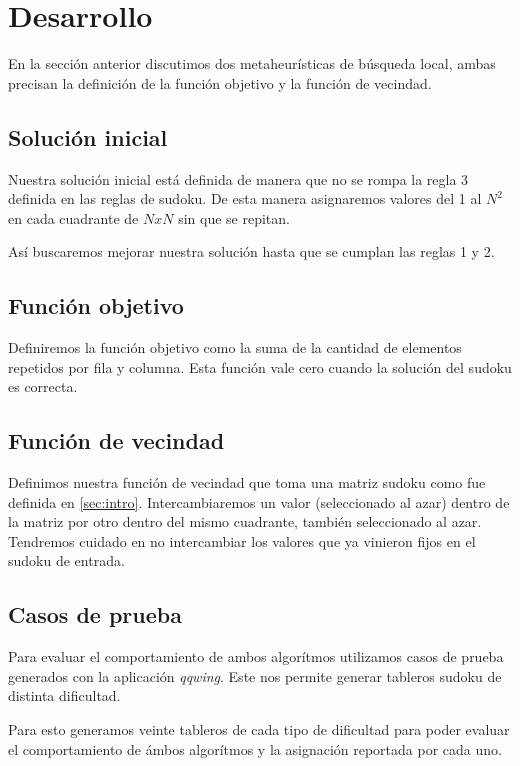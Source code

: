 \documentclass[a4paper,spanish]{article}
\begin{document}
\section{Desarrollo}


En la sección anterior discutimos dos metaheurísticas de búsqueda local, ambas
precisan la definición de la función objetivo y la función de vecindad.

\subsection{Solución inicial}

Nuestra solución inicial está definida de manera que no se rompa la regla 3
definida en las reglas de sudoku. De esta manera asignaremos valores del 1 al
$N^2$ en cada cuadrante de $NxN$ sin que se repitan.

Así buscaremos mejorar nuestra solución hasta que se cumplan las reglas 1 y 2. 

\subsection{Función objetivo}

Definiremos la función objetivo como la suma de la cantidad de elementos
repetidos por fila y columna.  
Esta función vale cero cuando la solución del sudoku es correcta.

\subsection{Función de vecindad}

Definimos nuestra función de vecindad que toma una matriz sudoku como fue
definida en \ref{sec:intro}.
Intercambiaremos un valor (seleccionado al azar) dentro de la matriz por otro
dentro del mismo cuadrante, también seleccionado al azar. Tendremos cuidado en
no intercambiar los valores que ya vinieron fijos en el sudoku de entrada.


\subsection{Casos de prueba}


Para evaluar el comportamiento de ambos algorítmos utilizamos casos de prueba
generados con la aplicación \emph{qqwing}. Este nos permite generar tableros
sudoku de distinta dificultad.

Para esto generamos veinte tableros de cada tipo de dificultad para poder
evaluar el comportamiento de ámbos algorítmos y la asignación reportada por cada
uno.
\end{document}
